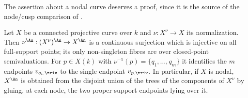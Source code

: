 The assertion about a nodal curve deserves a proof, since it is the source
of the node/cusp comparison of .

\begin{proposition}
\label{prop:ch32-nodal-curve}
Let $X$ be a connected projective curve over $k$ and
$\nu:X^\nu\to X$ its normalization.  Then
$\nu^{\An}:(X^{\nu})^{\An}\to X^{\An}$ is a continuous surjection which is
injective on all full-support points; its only non-singleton fibres
are over closed-point semivaluations.  For $p\in X(k)$ with
$\nu^{-1}(p)=\{q_1,\ldots,q_m\}$ it identifies the $m$ endpoints
$v_{q_i,\triv}$ to the single endpoint $v_{p,\triv}$.  In particular, if
$X$ is nodal, $X^{\An}$ is obtained from the disjoint union of the trees
of the components of $X^\nu$ by gluing, at each node, the two
proper-support endpoints lying over it.
\end{proposition}

